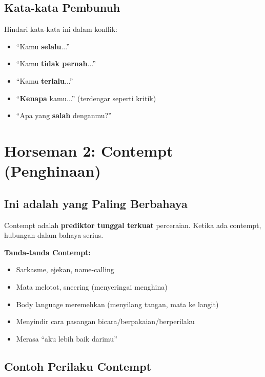 \subsection{Kata-kata Pembunuh}

Hindari kata-kata ini dalam konflik:
\begin{itemize}
    \item ``Kamu \textbf{selalu}...''
    \item ``Kamu \textbf{tidak pernah}...''
    \item ``Kamu \textbf{terlalu}...''
    \item ``\textbf{Kenapa} kamu...'' (terdengar seperti kritik)
    \item ``Apa yang \textbf{salah} denganmu?''
\end{itemize}

\section{Horseman 2: Contempt (Penghinaan)}

\subsection{Ini adalah yang Paling Berbahaya}

\begin{warningbox}[Contempt = Poison]
Contempt adalah \textbf{prediktor tunggal terkuat} perceraian. Ketika ada contempt, hubungan dalam bahaya serius.

\textbf{Tanda-tanda Contempt:}
\begin{itemize}
    \item Sarkasme, ejekan, name-calling
    \item Mata melotot, sneering (menyeringai menghina)
    \item Body language meremehkan (menyilang tangan, mata ke langit)
    \item Menyindir cara pasangan bicara/berpakaian/berperilaku
    \item Merasa ``aku lebih baik darimu''
\end{itemize}
\end{warningbox}

\subsection{Contoh Perilaku Contempt}

